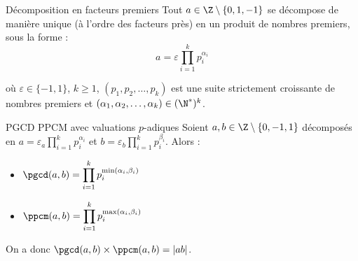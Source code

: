 \begin{theoreme}{Décomposition en facteurs premiers}{}
    Tout $a \in \Z \setminus \{0, 1, -1\}$ se décompose de manière unique (à l'ordre des facteurs près) en un produit
    de nombres premiers, sous la forme : 
    \[ a = \varepsilon \prod_{i = 1}^k p_i^{\alpha_i}\]

    où $\varepsilon \in \{-1, 1\}$, $k \geqslant 1$, $(p_1, p_2, \ldots, p_k)$ est une suite strictement croissante de nombres premiers
    et $(\alpha_1, \alpha_2, \ldots, \alpha_k) \in (\N^*)^k$.
    
\end{theoreme}


\begin{proposition}{PGCD PPCM avec valuations $p$-adiques}{}
    Soient $a, b \in \Z \setminus \{0, -1, 1\}$ décomposés en 
    $\displaystyle a = \varepsilon_a \prod_{i = 1}^k p_i^{\alpha_i}$ et
    $\displaystyle b = \varepsilon_b \prod_{i = 1}^k p_i^{\beta_i}$. 
    Alors :
    
    \begin{itemize}
        \item $\displaystyle \pgcd(a, b) = \prod_{i = 1}^k p_i^{\min(\alpha_i, \beta_i)}$
        \item $\displaystyle \ppcm(a, b) = \prod_{i = 1}^k p_i^{\max(\alpha_i, \beta_i)}$
    \end{itemize} 
    
    On a donc $\displaystyle \pgcd(a, b) \times \ppcm(a, b) = |ab|$.
\end{proposition}

